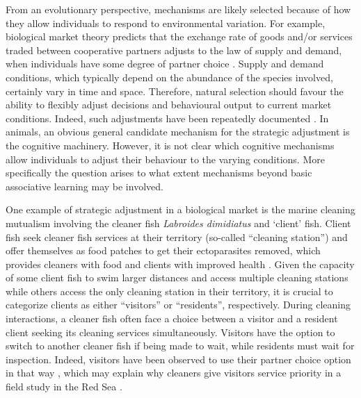 \documentclass[]{rsos}%
\begin{document}
From an evolutionary perspective, mechanisms are likely selected because
of how they allow individuals to respond to environmental variation.
For example, biological market theory predicts that the exchange rate of goods
and/or services traded between cooperative partners adjusts to the
law of supply and demand, when individuals have some degree of partner choice
\citep{noe_Biological_1995}. Supply and demand conditions, which typically
depend on the abundance of the species involved, certainly vary in time
and space. Therefore, natural selection should favour the ability
to flexibly adjust decisions and behavioural output to
current market conditions. Indeed, such adjustments have been repeatedly
documented \citep{axen_Signalling_1996}. In animals, an obvious general candidate
mechanism for the strategic adjustment is the cognitive machinery. However,
it is not clear which cognitive mechanisms allow individuals to adjust their
behaviour to the varying conditions. More specifically the question arises
to what extent mechanisms beyond basic associative learning may be involved.

One example of strategic adjustment in a biological market is the marine
cleaning mutualism involving the cleaner fish \emph{Labroides dimidiatus} and
`client' fish. Client fish seek cleaner fish services at their territory
(so-called ``cleaning station'') and offer themselves as food patches
to get their ectoparasites removed, which provides cleaners
with food and clients with improved health \citep{waldie_LongTerm_2011, ros_Does_2011, triki_Effects_2016, demaire_Reduced_2020}.
Given the capacity of some client fish to swim larger distances and
access multiple cleaning stations while others access the only cleaning
station in their territory, it is crucial to categorize clients as
either ``visitors'' or ``residents'', respectively. During cleaning interactions,
a cleaner fish often face a choice between a visitor and a resident client
seeking its cleaning services simultaneously. Visitors have the option
to switch to another cleaner fish if being made to wait, while residents
must wait for inspection. Indeed,
visitors have been observed to use their partner choice option in that
way \citep{bshary_Choosy_2002}, which may explain why cleaners give
visitors service priority in a field study in the Red Sea
\citep{bshary_Cleaner_2001}.
\end{document}
